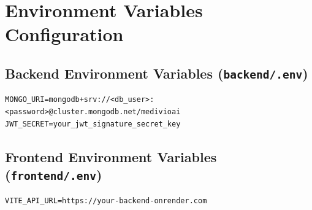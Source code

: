 \documentclass[12pt, a4paper, oneside]{report}
\begin{document}
\chapter{Environment Variables Configuration}
\label{app:env}

\section{Backend Environment Variables (\texttt{backend/.env})}

\begin{lstlisting}[language={}, caption={Backend environment configuration}]
MONGO_URI=mongodb+srv://<db_user>:<password>@cluster.mongodb.net/medivioai
JWT_SECRET=your_jwt_signature_secret_key
\end{lstlisting}

\section{Frontend Environment Variables (\texttt{frontend/.env})}

\begin{lstlisting}[language={}, caption={Frontend environment configuration}]
VITE_API_URL=https://your-backend-onrender.com
\end{lstlisting}
\end{document}

